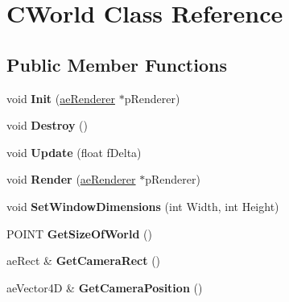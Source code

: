 \hypertarget{class_c_world}{}\section{C\+World Class Reference}
\label{class_c_world}
\subsection*{Public Member Functions}
\begin{DoxyCompactItemize}
\item 
void {\bfseries Init} (\hyperlink{classae_core_1_1ae_renderer}{ae\+Renderer} $\ast$p\+Renderer)\hypertarget{class_c_world_aedc3759328430cb0a31d7feebc972ce9}{}\label{class_c_world_aedc3759328430cb0a31d7feebc972ce9}

\item 
void {\bfseries Destroy} ()\hypertarget{class_c_world_a9b4d6fc4c5e68ec11f9d7dc47a01685a}{}\label{class_c_world_a9b4d6fc4c5e68ec11f9d7dc47a01685a}

\item 
void {\bfseries Update} (float f\+Delta)\hypertarget{class_c_world_a186c1db1f83397c3efa8e25cf7321b9d}{}\label{class_c_world_a186c1db1f83397c3efa8e25cf7321b9d}

\item 
void {\bfseries Render} (\hyperlink{classae_core_1_1ae_renderer}{ae\+Renderer} $\ast$p\+Renderer)\hypertarget{class_c_world_a2dfe0724e07d319f5942a292f20e77d0}{}\label{class_c_world_a2dfe0724e07d319f5942a292f20e77d0}

\item 
void {\bfseries Set\+Window\+Dimensions} (int Width, int Height)\hypertarget{class_c_world_aba7d683bd7b727e9bb36d06aed6cb90a}{}\label{class_c_world_aba7d683bd7b727e9bb36d06aed6cb90a}

\item 
P\+O\+I\+NT {\bfseries Get\+Size\+Of\+World} ()\hypertarget{class_c_world_a23f54ca7389d236b97e911c258c9dd6b}{}\label{class_c_world_a23f54ca7389d236b97e911c258c9dd6b}

\item 
ae\+Rect \& {\bfseries Get\+Camera\+Rect} ()\hypertarget{class_c_world_a958602f9e20587e60fa57fe51af31bb7}{}\label{class_c_world_a958602f9e20587e60fa57fe51af31bb7}

\item 
ae\+Vector4D \& {\bfseries Get\+Camera\+Position} ()\hypertarget{class_c_world_a8c7eb0d45c3b6a5727de707ed8f1e01d}{}\label{class_c_world_a8c7eb0d45c3b6a5727de707ed8f1e01d}


\end{DoxyCompactItemize}
